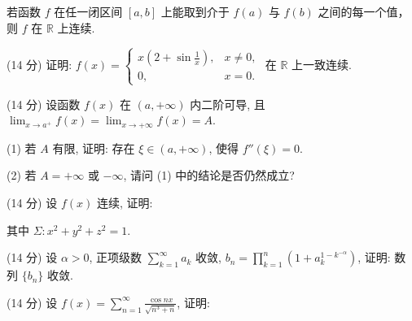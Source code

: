 若函数 $f$ 在任一闭区间 $[a, b]$ 上能取到介于 $f(a)$ 与 $f(b)$ 之间的每一个值，则 $f$ 在 $\mathbb{R}$ 上连续.\par
\par{}
(14 分) 证明: $f(x) = \begin{cases} x \left(2 + \sin \frac{1}{x}\right), & x \neq 0, \\ 0, & x = 0. \end{cases}$ 在 $\mathbb{R}$ 上一致连续.\par
\par{}
(14 分) 设函数 $f(x)$ 在 $(a, +\infty)$ 内二阶可导, 且 $\lim_{x \to a^{+}} f(x) = \lim_{x \to +\infty} f(x) = A$.\par
(1) 若 $A$ 有限, 证明: 存在 $\xi \in (a, +\infty)$, 使得 $f''(\xi) = 0$.\par
(2) 若 $A = +\infty$ 或 $-\infty$, 请问 (1) 中的结论是否仍然成立?\par
\par{}
\par{}
(14 分) 设 $f(x)$ 连续, 证明:\par
\nopagebreak[4]
其中 $\Sigma: x^{2} + y^{2} + z^{2} = 1$.\par
\par{}
(14 分) 设 $\alpha > 0$, 正项级数 $\sum_{k=1}^{\infty} a_k$ 收敛, $b_n = \prod_{k=1}^{n} \left(1 + a_k^{1-k^{-\alpha}}\right)$, 证明: 数列 $\{b_n\}$ 收敛.\par
\par{}
(14 分) 设 $f(x) = \sum_{n=1}^{\infty} \frac{\cos nx}{\sqrt{n^3 + n}}$, 证明:\par
